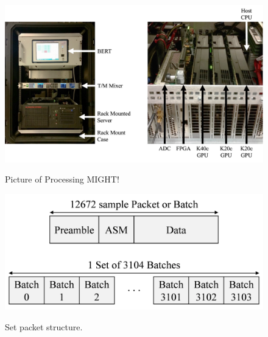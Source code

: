 \begin{figure}
	\centering\includegraphics[scale=0.5]{figures/systemOverview/HostSystem.jpg}
	\label{fig:HostSystem}
	\caption{Picture of Processing MIGHT!}
\end{figure}
\begin{figure}
	\centering\includegraphics[width=5.94in/100*55]{figures/eq_GPUimplementation/packet_batch_set.pdf}
	\label{fig:packet_batch_set}
	\caption{Set packet structure.}
\end{figure}

